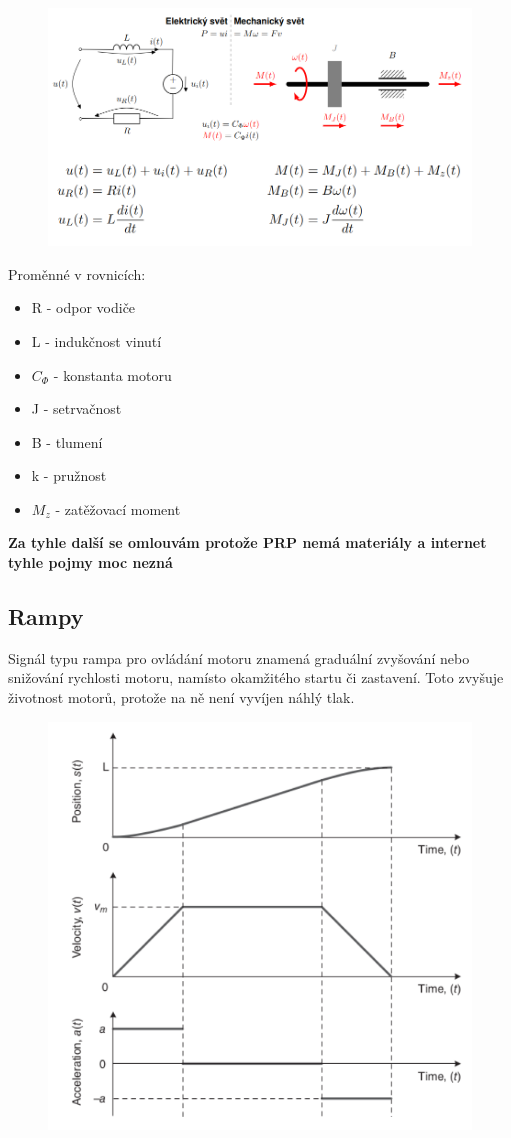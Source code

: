 \begin{figure}[h!]
    \centering
    \includegraphics[scale = 0.3]{img/MonRovPrech.png}
\end{figure}
Proměnné v rovnicích:
\begin{itemize}
    \item R - odpor vodiče
    \item L - indukčnost vinutí
    \item \(C_\Phi\) - konstanta motoru
    \item J - setrvačnost
    \item B - tlumení
    \item k - pružnost
    \item \(M_z\) - zatěžovací moment
\end{itemize}
\newpage
\textbf{Za tyhle další se omlouvám protože PRP nemá materiály a internet tyhle pojmy moc nezná}
\subsection{Rampy}
Signál typu rampa pro ovládání motoru znamená graduální zvyšování nebo snižování rychlosti motoru, namísto okamžitého startu či zastavení. Toto zvyšuje životnost motorů, protože na ně není vyvíjen náhlý tlak.
\begin{figure}[h!]
    \centering
    \includegraphics[scale = 0.4]{img/Rampa.png}
\end{figure}
